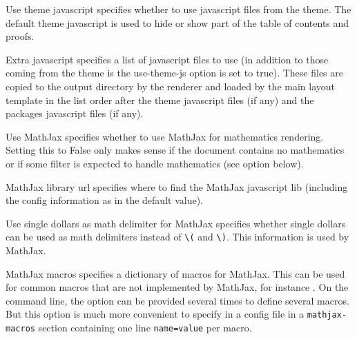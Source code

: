 \begin{configuration}{Use theme javascript}
specifies whether to use javascript files from the theme. The default
theme javascript is used to hide or show part of the table of contents
and proofs.
\end{configuration}

\begin{configuration}{Extra javascript}
specifies a list of javascript files to use (in addition
to those coming from the theme is the use-theme-js option is set to true).
These files are copied to the output directory by the
renderer and loaded by the main layout template in the list order after
the theme javascript files (if any) and the packages javascript files (if any).
\end{configuration}

\begin{configuration}{Use MathJax}
specifies whether to use MathJax for mathematics rendering. Setting this
to False only makes sense if the document contains no mathematics or if
some filter is expected to handle mathematics (see
 option below).
\end{configuration}

\begin{configuration}{MathJax library url}
specifies where to find the MathJax javascript lib (including the config
information as in the default value).
\end{configuration}

\begin{configuration}{Use single dollars as math delimiter for MathJax}
specifies whether single dollars can be used as math delimiters instead of
\verb+\(+ and \verb+\)+. This information is used by MathJax.
\end{configuration}

\begin{configuration}{MathJax macros}
specifies a dictionary of macros for MathJax.
This can be used for common macros that are not implemented by MathJax, for instance
. On the command line, the option can be provided several times
to define several macros. But this option is much more convenient to specify in a config file in
a \verb!mathjax-macros! section containing one line \verb!name=value! per macro.
\end{configuration}

